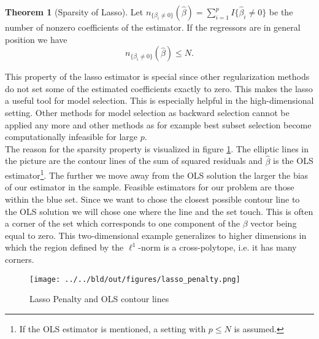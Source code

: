 \documentclass{article}
\theoremstyle{definition}
\newtheorem{theorem}{Theorem}
\begin{document}
\begin{theorem}[Sparsity of Lasso] \citep{tibshirani2013lasso} \label{theo: sparsity_lasso}
	Let $n_{\{\beta_i\neq 0\}}(\hat{\beta}) = \sum_{i=1}^{p} I \{\hat{\beta}_i \neq 0\}$ be the number of nonzero coefficients of the estimator.
	If the regressors are in general position we have 
	\begin{equation}
		n_{\{\beta_i\neq 0\}}(\hat{\beta}) \leq N.
	\end{equation}
\end{theorem}

This property of the lasso estimator is special since other regularization methods do not set some of the estimated coefficients exactly to zero. This makes the lasso a useful tool for model selection. This is especially helpful in the high-dimensional setting. Other methods for model selection as backward selection cannot be applied any more  and other methods as for example best subset selection become computationally infeasible for large $p$. \\

The reason for the sparsity property is visualized in figure \ref{lassopenalty}.
The elliptic lines in the picture are the contour lines of the sum of squared residuals and  $\hat{\beta}$ is the OLS estimator\footnote{If the OLS estimator is mentioned, a setting with $p\leq N$ is assumed.}. 
The further we move away from the OLS solution the larger the bias of our estimator in the sample.
Feasible estimators for our problem are those within the blue set.
Since we want to chose the closest possible contour line to the OLS solution we will chose one where the line and the set touch.
This is often a corner of the set which corresponds to one component of the $\beta$ vector being equal to zero. This two-dimensional example generalizes to higher dimensions in which the region defined by the $\ell^1$-norm is a cross-polytope, i.e. it has many corners. \newline

\begin{figure}
	\centering
	\texttt{[image: ../../bld/out/figures/lasso\_penalty.png]}
	\caption{Lasso Penalty and OLS contour lines}
	\label{lassopenalty}
\end{figure}


\end{document}
